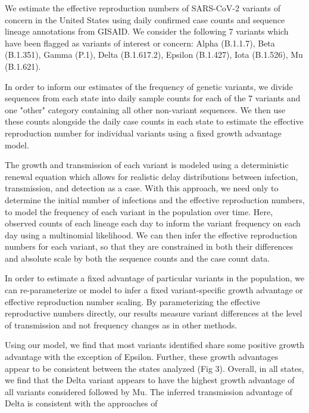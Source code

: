 \documentclass[12pt]{article}
\begin{document}
We estimate the effective reproduction numbers of SARS-CoV-2 variants of concern in the United States using daily confirmed case counts and sequence lineage annotations from GISAID. %
We consider the following 7 variants which have been flagged as variants of interest or concern: Alpha (B.1.1.7), Beta (B.1.351), Gamma (P.1), Delta (B.1.617.2), Epsilon (B.1.427), Iota (B.1.526), Mu (B.1.621).

In order to inform our estimates of the frequency of genetic variants, we divide sequences from each state into daily sample counts for each of the 7 variants and one "other" category containing all other non-variant sequences.
We then use these counts alongside the daily case counts in each state to estimate the effective reproduction number for individual variants using a fixed growth advantage model.

The growth and transmission of each variant is modeled using a deterministic renewal equation which allows for realistic delay distributions between infection, transmission, and detection as a case.
With this approach, we need only to determine the initial number of infections and the effective reproduction numbers, to model the frequency of each variant in the population over time.
Here, observed counts of each lineage each day to inform the variant frequency on each day using a multinomial likelihood.
We can then infer the effective reproduction numbers for each variant, so that they are constrained in both their differences and absolute scale by both the sequence counts and the case count data.

In order to estimate a fixed advantage of particular variants in the population, we can re-parameterize or model to infer a fixed variant-specific growth advantage or effective reproduction number scaling.
By parameterizing the effective reproductive numbers directly, our results measure variant differences at the level of transmission and not frequency changes as in other methods.

Using our model, we find that most variants identified share some positive growth advantage with the exception of Epsilon.
Further, these growth advantages appear to be consistent between the states analyzed (Fig 3).
Overall, in all states, we find that the Delta variant appears to have the highest growth advantage of all variants considered followed by Mu.
The inferred transmission advantage of Delta is consistent with the approaches of %
\end{document}
